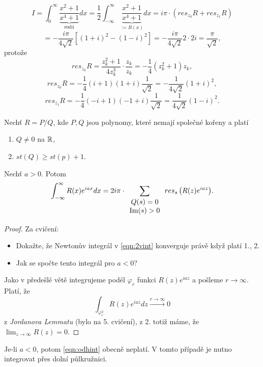 \begin{example}
$$I=\int_0^\infty{\underset{\text{sudá}}{\underbrace{\frac{x^2+1}{x^4+1}}}dx}
=\frac{1}{2}{\int_{-\infty}^\infty\underset{:=R(x)}{\underbrace{\frac{x^2+1}
{x^4+1}}}dx}=i\pi\cdot(res_{z_0}R+res_{z_1}R)$$
$$=-\frac{i\pi}{4\sqrt{2}}\left[(1+i)^2-(1-i)^2\right]=-\frac{i\pi}{4\sqrt{2}}2\cdot 2i=\frac{\pi}{\sqrt{2}},$$ protože
$${res}_{z_k}R=\frac{z_k^2+1}{4z^3_k}\cdot\frac{z_k}{z_k}=
-\frac{1}{4}(z_k^2+1)z_k,$$
$${res}_{z_0}R=-\frac{1}{4}(i+1)(1+i)\frac{1}{\sqrt{2}}=-\frac{1}{4\sqrt{2}}(1+i)^2,$$
$${res}_{z_1}R=-\frac{1}{4}(-i+1)(-1+i)\frac{1}{\sqrt{2}}=\frac{1}{4\sqrt{2}}(1-i)^2.$$
\end{example}

\begin{theorem}
Nechť $R=P/Q$, kde $P,Q$ jsou polynomy, které nemají společné kořeny a platí
\begin{enumerate}
    \item $Q\neq 0$ na $\operatorname{\mathbb{R}} $,
    \item $st(Q)\geq st(p)+1$.
\end{enumerate}
Nechť $a>0$. Potom
\begin{equation}
    \label{eqn:2vint}
    \int_{-\infty}^\infty{R(x)e^{iax}}dx = 2i\pi\cdot\sum_{\begin{array}{cc}
         Q(s)=0  \\
         \operatorname{Im}(s)>0 
    \end{array}}{res_s\left({R(z)e^{iaz}}\right)}.
\end{equation}
\end{theorem}
\begin{proof}
Za cvičení:
\begin{itemize}
    \item Dokažte, že Newtonův integrál v \cref{eqn:2vint} konverguje právě když platí 1., 2.
    \item Jak se spočte tento integrál pro $a<0$?
\end{itemize}
Jako v předešlé větě integrujeme podél $\varphi_r$ funkci $R(z)e^{iaz}$ a pošleme $r\to\infty$. Platí, že
\begin{equation}
    \int_{\varphi_r^2}{R(z)e^{iaz}}dz\overset{r\to\infty}{\longrightarrow}0
    \label{eqn:odhint}
\end{equation}
z \textit{Jordanova Lemmatu} (bylo na 5. cvičení), z 2. totiž máme, že $\lim_{z\to\infty}R(z)=0$.
\end{proof}

\begin{note}
Je-li $a<0$, potom \cref{eqn:odhint} obecně neplatí. V tomto případě je nutno integrovat přes dolní půlkružnici.
\end{note}

